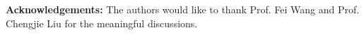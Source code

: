 \documentclass[12pt]{article}
\def\d{\mathrm{d}}
\numberwithin{equation}{section}
\begin{document}
    \vspace{4 mm}
	\noindent \textbf{Acknowledgements:} The authors would like to thank Prof. Fei Wang and Prof. Chengjie Liu for the meaningful discussions.

\end{document}
